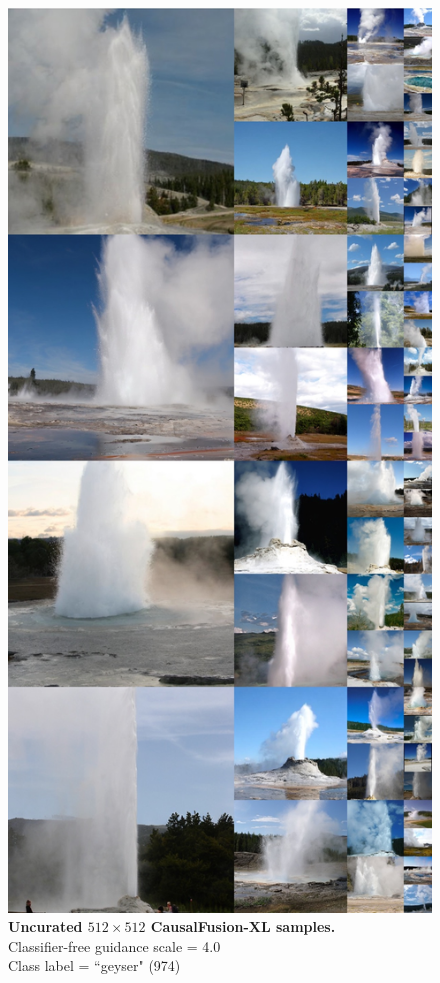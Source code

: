 \begin{figure}\centering
\includegraphics[width=\linewidth]{figs/xl512_974_cfg1.5.jpg}
\caption{\textbf{Uncurated $512\times512$ CausalFusion-XL samples.} \\Classifier-free guidance scale = 4.0\\Class label = ``geyser" (974)}\vspace{-2mm}
\label{fig:samples512_8}
\end{figure}



